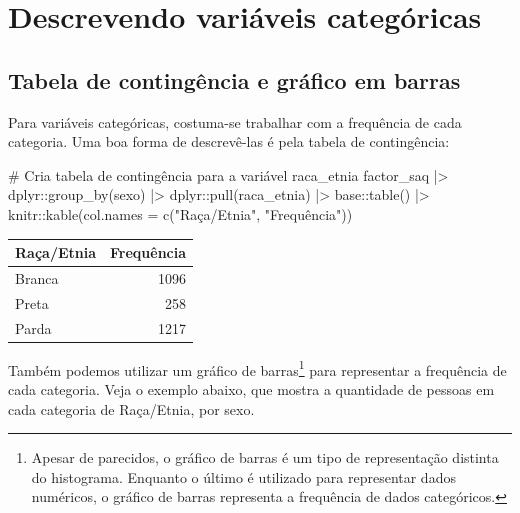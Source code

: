 \documentclass[
  letterpaper,
  DIV=11,
  numbers=noendperiod]{scrartcl}
\newenvironment{Shaded}{\begin{snugshade}}{\end{snugshade}}
\newcommand{\AttributeTok}[1]{\textcolor[rgb]{0.40,0.45,0.13}{#1}}
\newcommand{\CommentTok}[1]{\textcolor[rgb]{0.37,0.37,0.37}{#1}}
\newcommand{\FunctionTok}[1]{\textcolor[rgb]{0.28,0.35,0.67}{#1}}
\newcommand{\NormalTok}[1]{\textcolor[rgb]{0.00,0.23,0.31}{#1}}
\newcommand{\SpecialCharTok}[1]{\textcolor[rgb]{0.37,0.37,0.37}{#1}}
\newcommand{\StringTok}[1]{\textcolor[rgb]{0.13,0.47,0.30}{#1}}
\begin{document}
\hypertarget{descrevendo-variuxe1veis-categuxf3ricas}{%
\section{Descrevendo variáveis
categóricas}\label{descrevendo-variuxe1veis-categuxf3ricas}}

\hypertarget{tabela-de-continguxeancia-e-gruxe1fico-em-barras}{%
\subsection{Tabela de contingência e gráfico em
barras}\label{tabela-de-continguxeancia-e-gruxe1fico-em-barras}}

Para variáveis categóricas, costuma-se trabalhar com a frequência de
cada categoria. Uma boa forma de descrevê-las é pela tabela de
contingência:

\begin{Shaded}
\begin{Highlighting}[]
\CommentTok{\# Cria tabela de contingência para a variável raca\_etnia}
\NormalTok{factor\_saq }\SpecialCharTok{|\textgreater{}} 
\NormalTok{  dplyr}\SpecialCharTok{::}\FunctionTok{group\_by}\NormalTok{(sexo) }\SpecialCharTok{|\textgreater{}} 
\NormalTok{  dplyr}\SpecialCharTok{::}\FunctionTok{pull}\NormalTok{(raca\_etnia) }\SpecialCharTok{|\textgreater{}} 
\NormalTok{  base}\SpecialCharTok{::}\FunctionTok{table}\NormalTok{() }\SpecialCharTok{|\textgreater{}} 
\NormalTok{  knitr}\SpecialCharTok{::}\FunctionTok{kable}\NormalTok{(}\AttributeTok{col.names =} \FunctionTok{c}\NormalTok{(}\StringTok{"Raça/Etnia"}\NormalTok{, }\StringTok{"Frequência"}\NormalTok{))}
\end{Highlighting}
\end{Shaded}

\begin{longtable}[]{@{}lr@{}}
\toprule\noalign{}
Raça/Etnia & Frequência \\
\midrule\noalign{}
\endhead
\bottomrule\noalign{}
\endlastfoot
Branca & 1096 \\
Preta & 258 \\
Parda & 1217 \\
\end{longtable}

Também podemos utilizar um gráfico de barras\footnote{Apesar de
  parecidos, o gráfico de barras é um tipo de representação distinta do
  histograma. Enquanto o último é utilizado para representar dados
  numéricos, o gráfico de barras representa a frequência de dados
  categóricos.} para representar a frequência de cada categoria. Veja o
exemplo abaixo, que mostra a quantidade de pessoas em cada categoria de
Raça/Etnia, por sexo.
\end{document}
